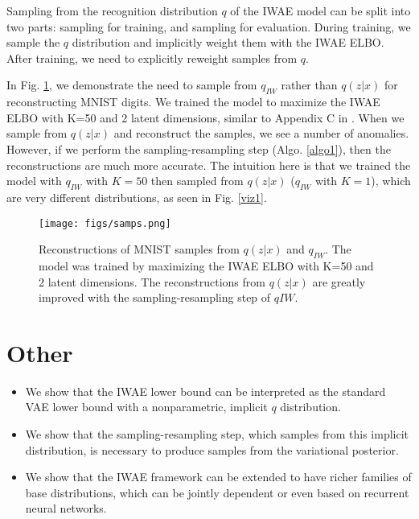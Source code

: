 \documentclass{article} %
\begin{document}
Sampling from the recognition distribution $q$ of the IWAE model can be split into two parts: sampling for training, and sampling for evaluation. During training, we sample the $q$ distribution and implicitly weight them with the IWAE ELBO. After training, we need to explicitly reweight samples from $q$.

In Fig. \ref{recon}, we demonstrate the need to sample from $q_{IW}$ rather than $q(z|x)$ for reconstructing MNIST digits. We trained the model to maximize the IWAE ELBO with K=50 and 2 latent dimensions, similar to Appendix C in \cite{burda2015importance}. When we sample from $q(z|x)$ and reconstruct the samples, we see a number of anomalies. However, if we perform the sampling-resampling step (Algo. \ref{algo1}), then the reconstructions are much more accurate. The intuition here is that we trained the model with $q_{IW}$ with $K=50$ then sampled from $q(z|x)$ ($q_{IW}$ with $K=1$), which are very different distributions, as seen in Fig. \ref{viz1}. 



\begin{figure}[ht]
  \centering
      \texttt{[image: figs/samps.png]}
  \caption{Reconstructions of MNIST samples from $q(z|x)$ and $q_{IW}$. The model was trained by maximizing the IWAE ELBO with K=50 and 2 latent dimensions. The reconstructions from $q(z|x)$ are greatly improved with the sampling-resampling step of $qIW$.}
  \label{recon}
\end{figure}








\newpage

\section{Other}


\begin{itemize}
    \item We show that the IWAE lower bound can be interpreted as the standard VAE lower bound with a nonparametric, implicit $q$ distribution.
    \item We show that the sampling-resampling step, which samples from this implicit distribution, is necessary to produce samples from the variational posterior.  
    
    \item We show that the IWAE framework can be extended to have richer families of base distributions, which can be jointly dependent or even based on recurrent neural networks.
\end{itemize}
\end{document}
